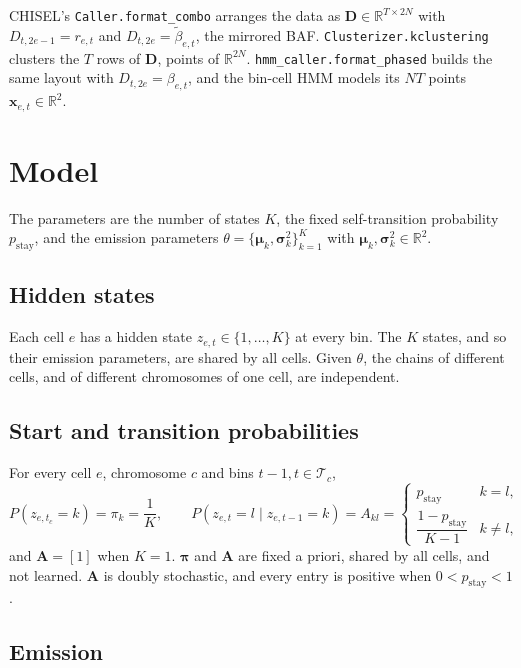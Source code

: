 \documentclass[11pt]{article}
\newcommand{\code}[1]{\texttt{#1}}
\newcommand{\pstay}{p_{\mathrm{stay}}}
\newcommand{\x}{\mathbf{x}}
\begin{document}
CHISEL's \code{Caller.format\_combo} arranges the data as
$\mathbf{D} \in \mathbb{R}^{T \times 2N}$ with $D_{t,2e-1} = r_{e,t}$ and
$D_{t,2e} = \tilde\beta_{e,t}$, the mirrored BAF. \code{Clusterizer.kclustering} clusters the
$T$ rows of $\mathbf{D}$, points of $\mathbb{R}^{2N}$. \code{hmm\_caller.format\_phased} builds
the same layout with $D_{t,2e} = \beta_{e,t}$, and the bin-cell HMM models its $NT$ points
$\x_{e,t} \in \mathbb{R}^2$.

\section{Model}\label{sec:model}

The parameters are the number of states $K$, the fixed self-transition probability $\pstay$,
and the emission parameters $\theta = \{\bm\mu_k, \bm\sigma^2_k\}_{k=1}^{K}$ with
$\bm\mu_k, \bm\sigma^2_k \in \mathbb{R}^2$.

\subsection{Hidden states}\label{sec:states}

Each cell $e$ has a hidden state $z_{e,t} \in \{1, \dots, K\}$ at every bin. The $K$ states,
and so their emission parameters, are shared by all cells. Given $\theta$, the chains of
different cells, and of different chromosomes of one cell, are independent.

\subsection{Start and transition probabilities}\label{sec:transitions}

For every cell $e$, chromosome $c$ and bins $t-1, t \in \mathcal{T}_c$,
\begin{equation}
P(z_{e,t_c} = k) = \pi_k = \frac1K, \qquad
P(z_{e,t} = l \mid z_{e,t-1} = k) = A_{kl} =
\begin{cases}
\pstay & k = l,\\[2pt]
\dfrac{1-\pstay}{K-1} & k \ne l,
\end{cases}
\label{eq:transitions}
\end{equation}
and $\mathbf{A} = [1]$ when $K = 1$. $\bm\pi$ and $\mathbf{A}$ are fixed a priori, shared by
all cells, and not learned. $\mathbf{A}$ is doubly stochastic, and every entry is positive when
$0 < \pstay < 1$.

\subsection{Emission}\label{sec:emission}
\end{document}

